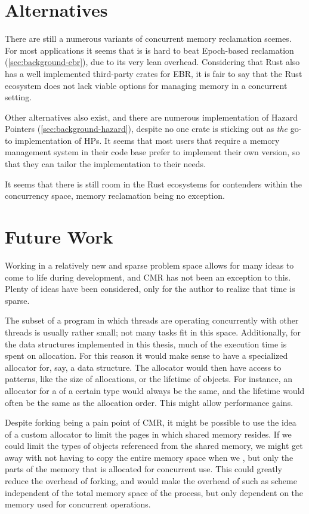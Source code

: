 \section{Alternatives}

There are still a numerous variants of concurrent memory reclamation scemes. For most applications
it seems that is is hard to beat Epoch-based reclamation (\cref{sec:background-ebr}), due to its
very lean overhead. Considering that Rust also has a well implemented third-party crates for EBR,
it is fair to say that the Rust ecosystem does not lack viable options for managing memory in a
concurrent setting.

Other alternatives also exist, and there are numerous implementation of Hazard Pointers
(\cref{sec:background-hazard}), despite no one crate is sticking out as \emph{the} go-to
implementation of HPs. It seems that most users that require a memory management system in their
code base prefer to implement their own version, so that they can tailor the implementation to
their needs.

It seems that there is still room in the Rust ecosystems for contenders within the concurrency
space, memory reclamation being no exception.


\section{Future Work}

Working in a relatively new and sparse problem space allows for many ideas to come to life during
development, and CMR has not been an exception to this. Plenty of ideas have been considered, only
for the author to realize that time is sparse.

The subset of a program in which threads are operating concurrently with other threads is usually
rather small; not many tasks fit in this space. Additionally, for the data structures implemented
in this thesis, much of the execution time is spent on allocation. For this reason it would make
sense to have a specialized allocator for, say, a data structure. The allocator would then have
access to patterns, like the size of allocations, or the lifetime of objects. For instance, an
allocator for a  of a certain type would always be the same, and the lifetime would
often be the same as the allocation order. This might allow performance gains.

Despite forking being a pain point of CMR, it might be possible to use the idea of a custom
allocator to limit the pages in which shared memory resides. If we could limit the types of objects
referenced from the shared memory, we might get away with not having to copy the entire memory
space when we , but only the parts of the memory that is allocated for concurrent use.
This could greatly reduce the overhead of forking, and would make the overhead of such as scheme
independent of the total memory space of the process, but only dependent on the memory used for
concurrent operations.

